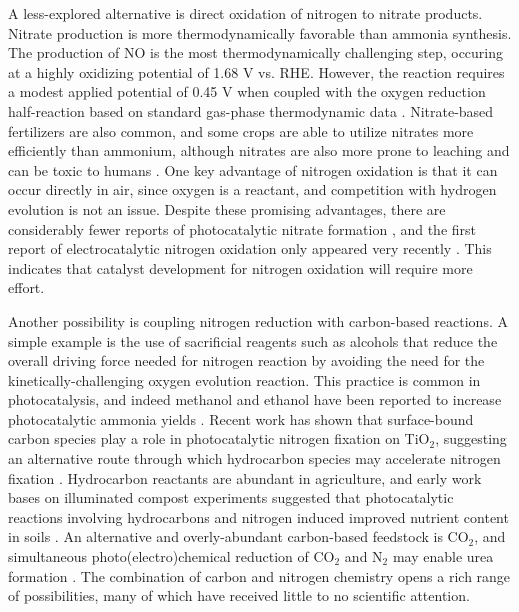 A less-explored alternative is direct oxidation of nitrogen to nitrate products. Nitrate production is more thermodynamically favorable than ammonia synthesis. The production of NO is the most thermodynamically challenging step, occuring at a highly oxidizing potential of 1.68 V vs. RHE. However, the reaction requires a modest applied potential of 0.45 V when coupled with the oxygen reduction half-reaction based on standard gas-phase thermodynamic data \cite{Chen_2018,Medford_2017, Comer_2018}. Nitrate-based fertilizers are also common, and some crops are able to utilize nitrates more efficiently than ammonium, although nitrates are also more prone to leaching and can be toxic to humans \cite{Wiesler_1998,Yao_2011,Mancino_1990, NAP9038}. One key advantage of nitrogen oxidation is that it can occur directly in air, since oxygen is a reactant, and competition with hydrogen evolution is not an issue. Despite these promising advantages, there are considerably fewer reports of photocatalytic nitrate formation \cite{Bickley_1979,Yuan_2013}, and the first report of electrocatalytic nitrogen oxidation only appeared very recently \cite{Wang_2019}. This indicates that catalyst development for nitrogen oxidation will require more effort. %
%

Another possibility is coupling nitrogen reduction with carbon-based reactions. A simple example is the use of sacrificial reagents such as alcohols that reduce the overall driving force needed for nitrogen reaction by avoiding the need for the kinetically-challenging oxygen evolution reaction. This practice is common in photocatalysis, and indeed methanol and ethanol have been reported to increase photocatalytic ammonia yields \cite{Ullmann_amm_2006}. Recent work has shown that surface-bound carbon species play a role in photocatalytic nitrogen fixation on TiO$_2$, suggesting an alternative route through which hydrocarbon species may accelerate nitrogen fixation \cite{Comer_JACS}. Hydrocarbon reactants are abundant in agriculture, and early work bases on illuminated compost experiments suggested that photocatalytic reactions involving hydrocarbons and nitrogen induced improved nutrient content in soils \cite{Dhar_1941}. An alternative and overly-abundant carbon-based feedstock is CO$_2$, and simultaneous photo(electro)chemical reduction of CO$_2$ and N$_2$ may enable urea formation \cite{Srinivas_2011}. 
The combination of carbon and nitrogen chemistry opens a rich range of possibilities, many of which have received little to no scientific attention.

